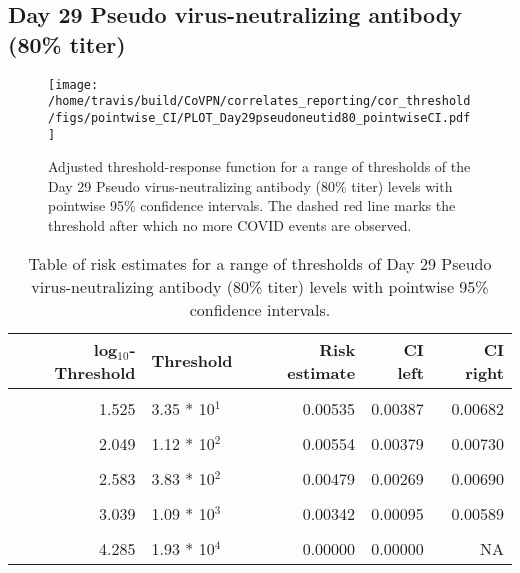 \documentclass[]{book}
\theoremstyle{definition}
\theoremstyle{definition}
\theoremstyle{definition}
\newcommand{\1}{\mathbbm{1}}
\begin{document}
\clearpage

\clearpage

\clearpage

\hypertarget{day-29-pseudo-virus-neutralizing-antibody-80-titer}{%
\subsection{Day 29 Pseudo virus-neutralizing antibody (80\% titer)}\label{day-29-pseudo-virus-neutralizing-antibody-80-titer}}

\begin{figure}[H]
\centering
\texttt{[image: /home/travis/build/CoVPN/correlates\_reporting/cor\_threshold/figs/pointwise\_CI/PLOT\_Day29pseudoneutid80\_pointwiseCI.pdf]}
\caption{Adjusted threshold-response function for a range of thresholds of the
  Day 29 Pseudo virus-neutralizing antibody (80\% titer) levels with pointwise 95\% confidence intervals. The dashed red line marks the threshold after which no more COVID events are observed. }
\end{figure}
\begin{table}[!h]

\caption{\label{tab:unnamed-chunk-361}Table of risk estimates for a range of thresholds of Day 29 Pseudo virus-neutralizing antibody (80\% titer) levels with pointwise 95\% confidence intervals.}
\centering
\begin{tabular}[t]{rlrrr}
\toprule
log$_{10}$-Threshold & Threshold & Risk estimate & CI left & CI right\\
\midrule
\cellcolor{gray!6}{0.699} & \cellcolor{gray!6}{5.00 * 10$^0$} & \cellcolor{gray!6}{0.00585} & \cellcolor{gray!6}{0.00442} & \cellcolor{gray!6}{0.00727}\\
1.525 & 3.35 * 10$^1$ & 0.00535 & 0.00387 & 0.00682\\
\cellcolor{gray!6}{1.840} & \cellcolor{gray!6}{6.92 * 10$^1$} & \cellcolor{gray!6}{0.00580} & \cellcolor{gray!6}{0.00412} & \cellcolor{gray!6}{0.00748}\\
2.049 & 1.12 * 10$^2$ & 0.00554 & 0.00379 & 0.00730\\
\cellcolor{gray!6}{2.276} & \cellcolor{gray!6}{1.89 * 10$^2$} & \cellcolor{gray!6}{0.00542} & \cellcolor{gray!6}{0.00350} & \cellcolor{gray!6}{0.00733}\\
2.583 & 3.83 * 10$^2$ & 0.00479 & 0.00269 & 0.00690\\
\cellcolor{gray!6}{2.785} & \cellcolor{gray!6}{6.10 * 10$^2$} & \cellcolor{gray!6}{0.00559} & \cellcolor{gray!6}{0.00288} & \cellcolor{gray!6}{0.00830}\\
3.039 & 1.09 * 10$^3$ & 0.00342 & 0.00095 & 0.00589\\
\cellcolor{gray!6}{3.351} & \cellcolor{gray!6}{2.24 * 10$^3$} & \cellcolor{gray!6}{0.00161} & \cellcolor{gray!6}{0.00000} & \cellcolor{gray!6}{0.00398}\\
4.285 & 1.93 * 10$^4$ & 0.00000 & 0.00000 & NA\\
\bottomrule
\end{tabular}
\end{table}
\end{document}
